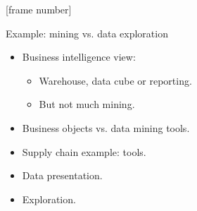 \documentclass[aspectratio=169,t]{beamer}
\begin{document}
  {
    [frame number]
    \begin{frame}{Example: mining vs. data exploration}
    \begin{itemize}
        \item Business intelligence view:
        \begin{itemize}
            \item Warehouse, data cube or reporting.
            \item But not much mining.
        \end{itemize}
        \item Business objects vs. data mining tools.
        \item Supply chain example: tools.
        \item Data presentation.
        \item Exploration.
    \end{itemize}
    \end{frame}
  }
\end{document}
